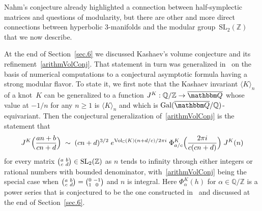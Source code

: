 \documentclass[12pt,reqno]{amsart}
\theoremstyle{definition}
\def\BQ{\mathbbm Q}
\def\la{\langle}
\def\ra{\rangle}
\def\SL{\mathrm{SL}}
\def\Vol{\mathrm{Vol}}
\def\a{\alpha}
\def\be{\begin{equation}}
\def\ee{\end{equation}}
\def\C{\mathbb C}
\def\Z{\mathbb Z}
\def\Q{\mathbb Q}
\def\sma#1#2#3#4{\bigl(\smallmatrix#1&#2\\#3&#4\endsmallmatrix\bigr)}
\def\Qbar{\overline{\BQ}}
\def\sma#1#2#3#4{\bigl(\!\smallmatrix#1&#2\\#3&#4\endsmallmatrix\!\bigr)}  %
\begin{document}
\bigskip 


\smallskip\noindent 
Nahm's conjecture already highlighted a connection between half-symplectic matrices and 
questions of modularity, but there are other and more direct connections between hyperbolic 
3-manifolds and the modular group~$\SL_2(\Z)$ that we now describe.

At the end of Section~\ref{sec.6} we discussed Kashaev's volume conjecture and its 
refinement~\eqref{arithmVolConj}.  That statement in turn was generalized in~\cite{Z:QMF}
on the basis of numerical computations to a conjectural asymptotic formula having a strong
modular flavor. To state it, we first note that the Kashaev invariant $\la K\ra_n$ of a
knot~$K$ can be generalized to a function $J^K:\Q/\Z\to\Qbar$ whose value at $-1/n$ for any
$n\ge1$ is $\la K\ra_n$ and which is $\text{Gal}(\Qbar/\Q)$-equivariant.
Then the conjectural generalization of~\eqref{arithmVolConj} is the statement that
\be
\label{QMCb}
J^K\Bigl(\frac{an+b}{cn+d}\Bigr) \;\sim\; (cn+d)^{3/2} \;
e^{\Vol_\C(K)(n+d/c)/2\pi i}\; \Phi^K_{a/c}\Bigl(\frac{2 \pi i}{c(cn+d)}\Bigr)\; J^K(n)
\ee
for every matrix $\sma abcd\in\SL_2(\Z)$ as $n$ tends to infinity through either 
integers or rational numbers with bounded denominator, with~\eqref{arithmVolConj} being
the special case when $\sma abcd=\sma 0{-1}10$ and $n$ is integral.  Here $\Phi^K_\a(h)$
for $\a\in\Q/\Z$ is a power series that is conjectured to be the one constructed in~\cite{DG2}
and discussed at the end of Section~\ref{sec.6}.
\end{document}
